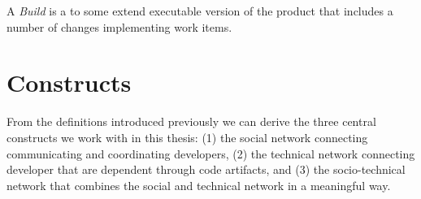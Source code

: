 \begin{note}
\begin{mydef}
A \emph{Build} is a to some extend executable version of the product that includes a number of changes implementing work items.
\end{mydef}
\end{note}

\section{Constructs}
\label{c5:sec:constructs}
From the definitions introduced previously we can derive the three central constructs we work with in this thesis: (1) the social network connecting communicating and coordinating developers, (2) the technical network connecting developer that are dependent through code artifacts, and (3) the socio-technical network that combines the social and technical network in a meaningful way.

